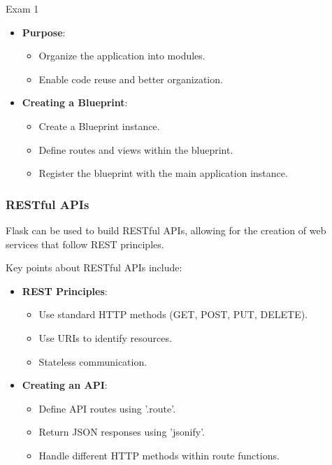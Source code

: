 \begin{examnotes}{Exam 1}
\begin{highlight}[Blueprints]
        \begin{itemize}
            \item \textbf{Purpose}:
                \begin{itemize}
                    \item Organize the application into modules.
                    \item Enable code reuse and better organization.
                \end{itemize}
            \item \textbf{Creating a Blueprint}:
                \begin{itemize}
                    \item Create a Blueprint instance.
                    \item Define routes and views within the blueprint.
                    \item Register the blueprint with the main application instance.
                \end{itemize}
        \end{itemize}
    \end{highlight}
    
    \subsubsection*{RESTful APIs}
    
    Flask can be used to build RESTful APIs, allowing for the creation of web services that follow REST principles.
    
    \begin{highlight}
        Key points about RESTful APIs include:
        
        \begin{itemize}
            \item \textbf{REST Principles}:
                \begin{itemize}
                    \item Use standard HTTP methods (GET, POST, PUT, DELETE).
                    \item Use URIs to identify resources.
                    \item Stateless communication.
                \end{itemize}
            \item \textbf{Creating an API}:
                \begin{itemize}
                    \item Define API routes using '\@app.route'.
                    \item Return JSON responses using 'jsonify'.
                    \item Handle different HTTP methods within route functions.
                \end{itemize}
        \end{itemize}
    \end{highlight}
    

\end{examnotes}
